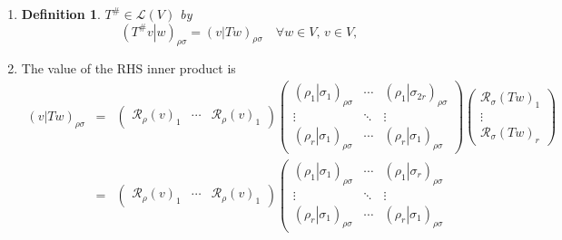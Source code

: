 \documentclass[aps,preprint]{revtex4}
\newtheorem{definition}[theorem]{Definition}
\begin{document}
\begin{enumerate}
\item 
\begin{definition}
$T^{\#}\in \mathcal{L}\left( V\right) $ by%
\begin{equation}
\left( \left. T^{\#}v\right\vert w\right) _{\rho \sigma }=\left( \left.
v\right\vert Tw\right) _{\rho \sigma }\quad \forall w\in V,\,v\in V,
\end{equation}
\end{definition}

\item The value of the RHS inner product is 
\begin{eqnarray}
\left( \left. v\right\vert Tw\right) _{\rho \sigma } &=&\left( 
\begin{array}{ccc}
\mathcal{R}_{\rho }\left( v\right) _{1} & \cdots & \mathcal{R}_{\rho }\left(
v\right) _{1}%
\end{array}%
\right) \left( 
\begin{array}{ccc}
\left( \left. \rho _{1}\right\vert \sigma _{1}\right) _{\rho \sigma } & 
\cdots & \left( \left. \rho _{1}\right\vert \sigma _{2r}\right) _{\rho
\sigma } \\ 
\vdots & \ddots & \vdots \\ 
\left( \left. \rho _{r}\right\vert \sigma _{1}\right) _{\rho \sigma } & 
\cdots & \left( \left. \rho _{r}\right\vert \sigma _{1}\right) _{\rho \sigma
}%
\end{array}%
\right) \left( 
\begin{array}{c}
\mathcal{R}_{\sigma }\left( Tw\right) _{1} \\ 
\vdots \\ 
\mathcal{R}_{\sigma }\left( Tw\right) _{r}%
\end{array}%
\right) \\
&=&\left( 
\begin{array}{ccc}
\mathcal{R}_{\rho }\left( v\right) _{1} & \cdots & \mathcal{R}_{\rho }\left(
v\right) _{1}%
\end{array}%
\right) \left( 
\begin{array}{ccc}
\left( \left. \rho _{1}\right\vert \sigma _{1}\right) _{\rho \sigma } & 
\cdots & \left( \left. \rho _{1}\right\vert \sigma _{r}\right) _{\rho \sigma
} \\ 
\vdots & \ddots & \vdots \\ 
\left( \left. \rho _{r}\right\vert \sigma _{1}\right) _{\rho \sigma } & 
\cdots & \left( \left. \rho _{r}\right\vert \sigma _{1}\right) _{\rho \sigma
}%
\end{array}%

\end{eqnarray}
\end{enumerate}
\end{document}
